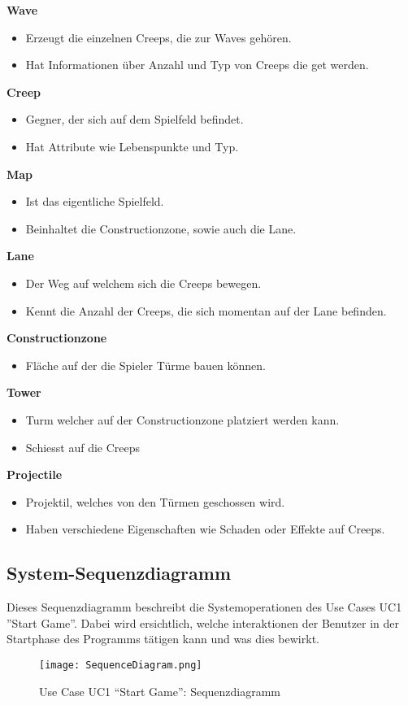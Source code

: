 \textbf{Wave}
\begin{itemize}
\item Erzeugt die einzelnen Creeps, die zur Waves gehören.
\item Hat Informationen über Anzahl und Typ von Creeps die get werden.
\end{itemize}

\textbf{Creep}
\begin{itemize}
\item Gegner, der sich auf dem Spielfeld befindet.
\item Hat Attribute wie Lebenspunkte und Typ.
\end{itemize}

\textbf{Map}
\begin{itemize}
\item Ist das eigentliche Spielfeld.
\item Beinhaltet die Constructionzone, sowie auch die Lane.
\end{itemize}

\textbf{Lane}
\begin{itemize}
\item Der Weg auf welchem sich die Creeps bewegen.
\item Kennt die Anzahl der Creeps, die sich momentan auf der Lane befinden.
\end{itemize}

\textbf{Constructionzone}
\begin{itemize}
\item Fläche auf der die Spieler Türme bauen können.
\end{itemize}

\textbf{Tower}
\begin{itemize}
\item Turm welcher auf der Constructionzone platziert werden kann.
\item Schiesst auf die Creeps
\end{itemize}

\textbf{Projectile}
\begin{itemize}
\item Projektil, welches von den Türmen geschossen wird.
\item Haben verschiedene Eigenschaften wie Schaden oder Effekte auf Creeps.
\end{itemize}

\newpage
\subsection{System-Sequenzdiagramm}
Dieses Sequenzdiagramm beschreibt die Systemoperationen des Use Cases UC1 ''Start Game''. Dabei wird ersichtlich, welche interaktionen der Benutzer in der Startphase des Programms tätigen kann und was dies bewirkt.

\begin{figure}[htb]
 \begin{center}
  \leavevmode
  \texttt{[image: SequenceDiagram.png]}
 \end{center}
 \caption{Use Case UC1 ``Start Game'': Sequenzdiagramm}
 \label{fig:Sequenzdiagramm}
\end{figure}

